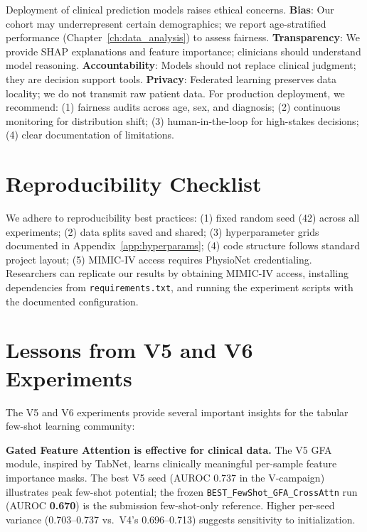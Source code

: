 Deployment of clinical prediction models raises ethical concerns. \textbf{Bias}: Our cohort may underrepresent certain demographics; we report age-stratified performance (Chapter~\ref{ch:data_analysis}) to assess fairness. \textbf{Transparency}: We provide SHAP explanations and feature importance; clinicians should understand model reasoning. \textbf{Accountability}: Models should not replace clinical judgment; they are decision support tools. \textbf{Privacy}: Federated learning preserves data locality; we do not transmit raw patient data. For production deployment, we recommend: (1) fairness audits across age, sex, and diagnosis; (2) continuous monitoring for distribution shift; (3) human-in-the-loop for high-stakes decisions; (4) clear documentation of limitations.

\section{Reproducibility Checklist}

We adhere to reproducibility best practices: (1) fixed random seed (42) across all experiments; (2) data splits saved and shared; (3) hyperparameter grids documented in Appendix~\ref{app:hyperparams}; (4) code structure follows standard project layout; (5) MIMIC-IV access requires PhysioNet credentialing. Researchers can replicate our results by obtaining MIMIC-IV access, installing dependencies from \texttt{requirements.txt}, and running the experiment scripts with the documented configuration.

\section{Lessons from V5 and V6 Experiments}

The V5 and V6 experiments provide several important insights for the tabular few-shot learning community:

\textbf{Gated Feature Attention is effective for clinical data.} The V5 GFA module, inspired by TabNet, learns clinically meaningful per-sample feature importance masks. The best V5 seed (AUROC 0.737 in the V-campaign) illustrates peak few-shot potential; the frozen \texttt{BEST\_FewShot\_GFA\_CrossAttn} run (AUROC \textbf{0.670}) is the submission few-shot-only reference. Higher per-seed variance (0.703--0.737 vs.\ V4's 0.696--0.713) suggests sensitivity to initialization.

